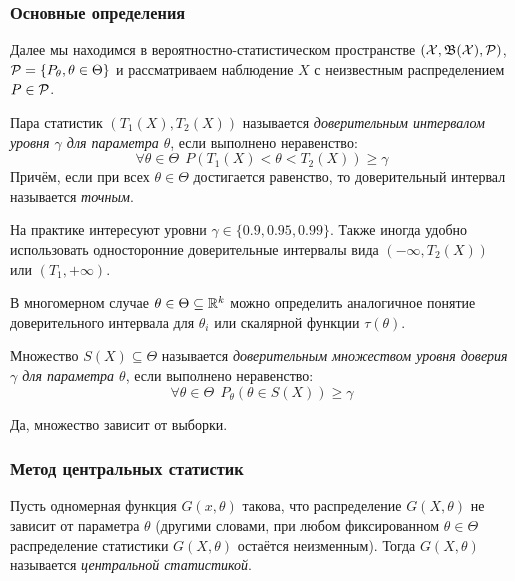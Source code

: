 \subsubsection{Основные определения}

\begin{note}
	Далее мы находимся в вероятностно-статистическом пространстве $(\mathcal{X}, \mathfrak{B}(\mathcal{X}), \mathcal{P})$, $\mathcal{P} = \{P_\theta, \theta \in \Theta\}$ и рассматриваем наблюдение $X$ с неизвестным распределением $P \in \mathcal{P}$.
\end{note}

\begin{definition}
	Пара статистик $(T_1(X), T_2(X))$ называется \textit{доверительным интервалом уровня $\gamma$ для параметра $\theta$}, если выполнено неравенство:
	\[
		\forall \theta \in \Theta\ \ P(T_1(X) < \theta < T_2(X)) \ge \gamma
	\]
	Причём, если при всех $\theta \in \Theta$ достигается равенство, то доверительный интервал называется \textit{точным}.
\end{definition}

\begin{note}
	На практике интересуют уровни $\gamma \in \{0.9, 0.95, 0.99\}$. Также иногда удобно использовать односторонние доверительные интервалы вида $(-\infty, T_2(X))$ или $(T_1, +\infty)$.
\end{note}

\begin{note}
	В многомерном случае $\theta \in \Theta \subseteq \mathbb{R}^k$ можно определить аналогичное понятие доверительного интервала для $\theta_i$ или скалярной функции $\tau(\theta)$.
\end{note}

\begin{definition}
	Множество $S(X) \subseteq \Theta$ называется \textit{доверительным множеством уровня доверия $\gamma$ для параметра $\theta$}, если выполнено неравенство:
	\[
		\forall \theta \in \Theta\ \ P_\theta(\theta \in S(X)) \ge \gamma
	\]
\end{definition}

\begin{anote}
	Да, множество зависит от выборки.
\end{anote}

\subsubsection{Метод центральных статистик}

\begin{definition}
	Пусть одномерная функция $G(x, \theta)$ такова, что распределение $G(X, \theta)$ не зависит от параметра $\theta$ (другими словами, при любом фиксированном $\theta \in \Theta$ распределение статистики $G(X, \theta)$ остаётся неизменным). Тогда $G(X, \theta)$ называется \textit{центральной статистикой}.
\end{definition}

